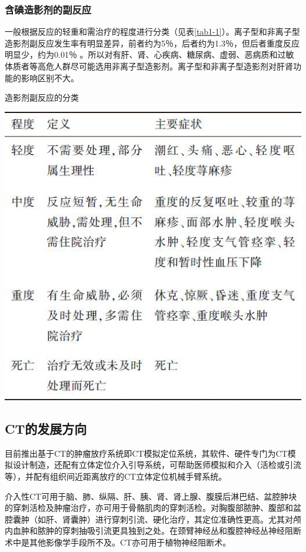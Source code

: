 \subsubsection{含碘造影剂的副反应}

一般根据反应的轻重和需治疗的程度进行分类（见表\ref{tab1-1}）。离子型和非离子型造影剂副反应发生率有明显差异，前者约为5％，后者约为1.3％，但后者重度反应明显少，约为0.01％
。所以对有肝、肾、心疾病、糖尿病、虚弱、恶病质和过敏体质者等高危人群尽可能选用非离子型造影剂。离子型和非离子型造影剂对肝肾功能的影响区别不大。

\begin{table}[htbp]
\centering
\caption{造影剂副反应的分类}
\label{tab1-1}
\includegraphics[width=\textwidth,height=\textheight,keepaspectratio]{./images/Image00003.jpg}
\end{table}

\subsection{CT的发展方向}

目前推出基于CT的肿瘤放疗系统即CT模拟定位系统，其软件、硬件专门为CT模拟设计制造，还配有立体定位介入引导系统，可帮助医师模拟和介入（活检或引流等），并配有组织间近距离放疗的CT立体定位机械手臂系统。

介入性CT可用于脑、肺、纵隔、肝、胰、肾、肾上腺、腹膜后淋巴结、盆腔肿块的穿刺活检及肿瘤治疗，亦可用于骨骼肌肉的穿刺活检。对胸腹部脓肿、腹部和盆腔囊肿（如肝、肾囊肿）进行穿刺引流、硬化治疗，其定位准确性更高。尤其对颅内血肿和脓肿的穿刺抽吸引流更具独到之处。在颈臂神经丛和腹腔神经丛神经阻断术中是其他影像学手段所不及。CT亦可用于植物神经阻断术。

